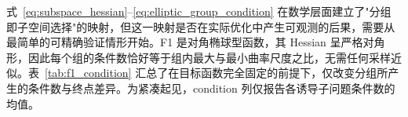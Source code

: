 式~\eqref{eq:subspace_hessian}--\eqref{eq:elliptic_group_condition} 在数学层面建立了"分组即子空间选择"的映射，但这一映射是否在实际优化中产生可观测的后果，需要从最简单的可精确验证情形开始。F1 是对角椭球型函数，其 Hessian 呈严格对角形，因此每个组的条件数恰好等于组内最大与最小曲率尺度之比，无需任何采样近似。表~\ref{tab:f1_condition} 汇总了在目标函数完全固定的前提下，仅改变分组所产生的条件数与终点差异。为紧凑起见，condition 列仅报告各诱导子问题条件数的均值。
